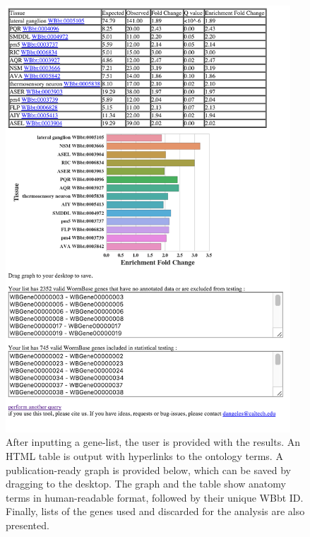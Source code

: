 \documentclass{bmcart}
\begin{document}
\begin{backmatter}

\begin{figure}
	\centering
    \includegraphics[width=0.95\textwidth]{figures/guiresults.png}
  	\captionsetup{width= 0.95\textwidth}
 	\caption{
  After inputting a gene-list, the user is provided with the results. 
  An HTML table is output with hyperlinks to the ontology terms. A 
  publication-ready graph is provided below, which can be saved by 
  dragging to the desktop. The graph and the table show anatomy terms in
  human-readable format, followed by their unique WBbt ID. Finally, lists 
  of the genes used and discarded for the analysis are also presented.
  }
  \label{fig:GUIresults}
\end{figure}


\end{backmatter}
\end{document}
